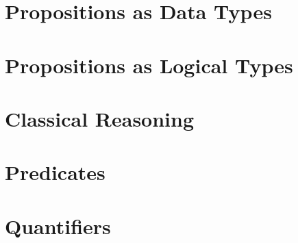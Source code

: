\documentclass{book}
\begin{document}
\hypertarget{book__pandoc__debug__src__dmt1__lectures__l07_predicatelogic__01_propsascomptypes.lean.md}{}
\hypertarget{book__pandoc__debug__src__dmt1__lectures__l07_predicatelogic__01_propsascomptypes.lean.md__propositions-as-data-types}{%
\section{Propositions as Data Types}\label{book__pandoc__debug__src__dmt1__lectures__l07_predicatelogic__01_propsascomptypes.lean.md__propositions-as-data-types}}

\hypertarget{book__pandoc__debug__src__dmt1__lectures__l07_predicatelogic__01_propsaslogicaltypes.lean.md}{}
\hypertarget{book__pandoc__debug__src__dmt1__lectures__l07_predicatelogic__01_propsaslogicaltypes.lean.md__propositions-as-logical-types}{%
\section{Propositions as Logical Types}\label{book__pandoc__debug__src__dmt1__lectures__l07_predicatelogic__01_propsaslogicaltypes.lean.md__propositions-as-logical-types}}

\hypertarget{book__pandoc__debug__src__dmt1__lectures__l07_predicatelogic__03_classicalreasoning.lean.md}{}
\hypertarget{book__pandoc__debug__src__dmt1__lectures__l07_predicatelogic__03_classicalreasoning.lean.md__classical-reasoning}{%
\section{Classical Reasoning}\label{book__pandoc__debug__src__dmt1__lectures__l07_predicatelogic__03_classicalreasoning.lean.md__classical-reasoning}}

\hypertarget{book__pandoc__debug__src__dmt1__lectures__l07_predicatelogic__04_predicates.lean.md}{}
\hypertarget{book__pandoc__debug__src__dmt1__lectures__l07_predicatelogic__04_predicates.lean.md__predicates}{%
\section{Predicates}\label{book__pandoc__debug__src__dmt1__lectures__l07_predicatelogic__04_predicates.lean.md__predicates}}

\hypertarget{book__pandoc__debug__src__dmt1__lectures__l07_predicatelogic__05_quantifiers.lean.md}{}
\hypertarget{book__pandoc__debug__src__dmt1__lectures__l07_predicatelogic__05_quantifiers.lean.md__quantifiers}{%
\section{Quantifiers}\label{book__pandoc__debug__src__dmt1__lectures__l07_predicatelogic__05_quantifiers.lean.md__quantifiers}}
\end{document}
